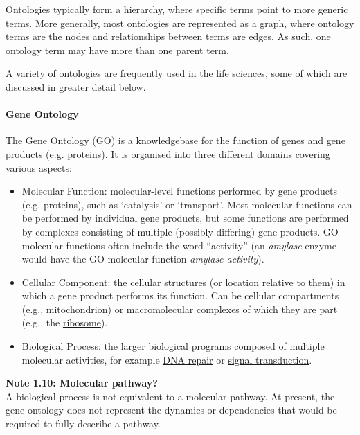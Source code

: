 Ontologies typically form a hierarchy, where specific terms point to more generic terms. More generally, most ontologies are represented as a graph, where ontology terms are the nodes and relationships between terms are edges. As such, one ontology term may have more than one parent term.

A variety of ontologies are frequently used in the life sciences, some of which are discussed in greater detail below.

\paragraph{Gene Ontology}\label{chapter1_gene_ontology}

The \href{http://geneontology.org/}{Gene Ontology} (GO) is a knowledgebase for the function of genes and gene products (e.g. proteins). It is organised into three different domains covering various aspects:

\begin{itemize}
\item Molecular Function: molecular-level functions performed by gene products (e.g. proteins), such as `catalysis' or `transport'.
Most molecular functions can be performed by individual gene products, but some functions are performed by complexes consisting of multiple (possibly differing) gene products.
GO molecular functions often include the word ``activity'' (an \textit{amylase} enzyme would have the GO molecular function \textit{amylase activity}).
\item Cellular Component: the cellular structures (or location relative to them) in which a gene product performs its function.
Can be cellular compartments (e.g., \href{http://amigo.geneontology.org/amigo/term/GO:0005739}{mitochondrion}) or macromolecular complexes of which they are part (e.g., the \href{http://amigo.geneontology.org/amigo/term/GO:0005840}{ribosome}).
\item Biological Process: the larger biological programs composed of multiple molecular activities, for example \href{http://amigo.geneontology.org/amigo/term/GO:0006281}{DNA repair} or \href{http://amigo.geneontology.org/amigo/term/GO:0007165}{signal transduction}.
\end{itemize}

\begin{framed}
\textbf{Note 1.10: Molecular pathway?}\\
A biological process is not equivalent to a molecular pathway.
At present, the gene ontology does not represent the dynamics or dependencies that would be required to fully describe a pathway.
\end{framed}


